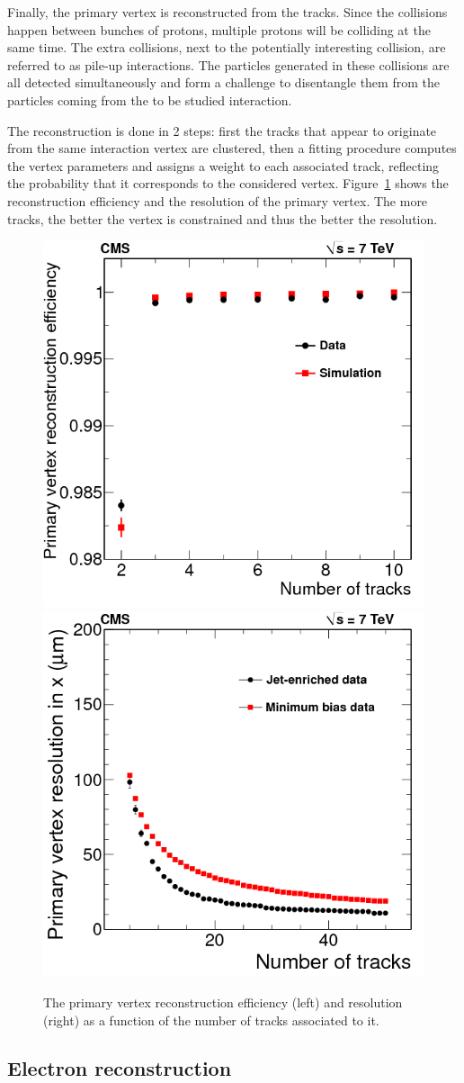 Finally, the primary vertex is reconstructed from the tracks. Since the collisions happen between bunches of protons, multiple protons will be colliding at the same time. The extra collisions, next to the potentially interesting collision, are referred to as pile-up interactions. The particles generated in these collisions are all detected simultaneously and form a challenge to disentangle them from the particles coming from the to be studied interaction.

The reconstruction is done in 2 steps: first the tracks that appear to originate from the same interaction vertex are clustered, then a fitting procedure computes the vertex parameters and assigns a weight to each associated track, reflecting the probability that it corresponds to the considered vertex. Figure~\ref{fig:PV} shows the reconstruction efficiency and the resolution of the primary vertex. The more tracks, the better the vertex is constrained and thus the better the resolution.

\begin{figure}[ht]
  \centering
\includegraphics[width=.4\textwidth]{PV_eff}\hspace{1cm}
 \includegraphics[width=.4\textwidth]{PV_res} 
 \caption{The primary vertex reconstruction efficiency (left) and resolution (right) as a function of the number of tracks associated to it.~\cite{Chatrchyan:2014fea}}
 \label{fig:PV}
\end{figure}

\subsection{Electron reconstruction}
\label{sec:electron_reconstruction}

